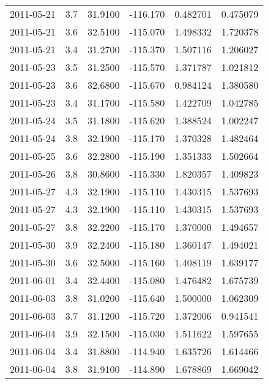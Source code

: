 \begin{tabular}{lrrrrr}
2011-05-21 &       3.7 &  31.9100 &  -116.170 &         0.482701 &         0.475079 \\
2011-05-21 &       3.6 &  32.5100 &  -115.070 &         1.498332 &         1.720378 \\
2011-05-21 &       3.4 &  31.2700 &  -115.370 &         1.507116 &         1.206027 \\
2011-05-23 &       3.5 &  31.2500 &  -115.570 &         1.371787 &         1.021812 \\
2011-05-23 &       3.6 &  32.6800 &  -115.670 &         0.984124 &         1.380580 \\
2011-05-23 &       3.4 &  31.1700 &  -115.580 &         1.422709 &         1.042785 \\
2011-05-24 &       3.5 &  31.1800 &  -115.620 &         1.388524 &         1.002247 \\
2011-05-24 &       3.8 &  32.1900 &  -115.170 &         1.370328 &         1.482464 \\
2011-05-25 &       3.6 &  32.2800 &  -115.190 &         1.351333 &         1.502664 \\
2011-05-26 &       3.8 &  30.8600 &  -115.330 &         1.820357 &         1.409823 \\
2011-05-27 &       4.3 &  32.1900 &  -115.110 &         1.430315 &         1.537693 \\
2011-05-27 &       4.3 &  32.1900 &  -115.110 &         1.430315 &         1.537693 \\
2011-05-27 &       3.8 &  32.2200 &  -115.170 &         1.370000 &         1.494657 \\
2011-05-30 &       3.9 &  32.2400 &  -115.180 &         1.360147 &         1.494021 \\
2011-05-30 &       3.6 &  32.5000 &  -115.160 &         1.408119 &         1.639177 \\
2011-06-01 &       3.4 &  32.4400 &  -115.080 &         1.476482 &         1.675739 \\
2011-06-03 &       3.8 &  31.0200 &  -115.640 &         1.500000 &         1.062309 \\
2011-06-03 &       3.7 &  31.1200 &  -115.720 &         1.372006 &         0.941541 \\
2011-06-04 &       3.9 &  32.1500 &  -115.030 &         1.511622 &         1.597655 \\
2011-06-04 &       3.4 &  31.8800 &  -114.940 &         1.635726 &         1.614466 \\
2011-06-04 &       3.8 &  31.9100 &  -114.890 &         1.678869 &         1.669042 \\

\end{tabular}
